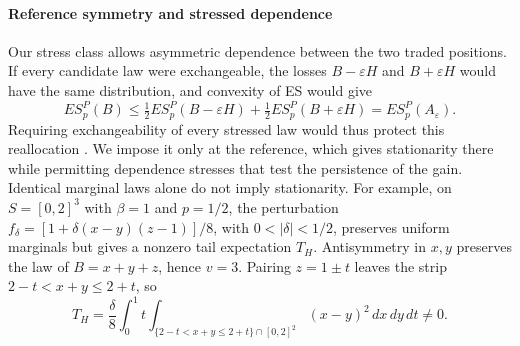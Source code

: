 \paragraph{Reference symmetry and stressed dependence}\label{par:reference-symmetry}
Our stress class allows asymmetric dependence between the two traded positions. If every candidate law were exchangeable, the losses \(B-\varepsilon H\) and \(B+\varepsilon H\) would have the same distribution, and convexity of ES would give
\begin{equation}
ES_p^P(B)\le\tfrac12 ES_p^P(B-\varepsilon H)+\tfrac12 ES_p^P(B+\varepsilon H)
=ES_p^P(A_\varepsilon).
\tag{2.15}\label{eq:2.15}
\end{equation}
Requiring exchangeability of every stressed law would thus protect this reallocation \cite{chen2022,liu2026}. We impose it only at the reference, which gives stationarity there while permitting dependence stresses that test the persistence of the gain. Identical marginal laws alone do not imply stationarity. For example, on \(S=[0,2]^3\) with \(\beta=1\) and \(p=1/2\), the perturbation \(f_\delta=[1+\delta(x-y)(z-1)]/8\), with \(0<|\delta|<1/2\), preserves uniform marginals but gives a nonzero tail expectation \(T_H\). Antisymmetry in \(x,y\) preserves the law of \(B=x+y+z\), hence \(v=3\). Pairing \(z=1\pm t\) leaves the strip \(2-t<x+y\le2+t\), so
\[
T_H=\frac{\delta}{8}\int_0^1 t\int_{\{2-t<x+y\le2+t\}\cap[0,2]^2}(x-y)^2\,dx\,dy\,dt\ne0.
\]
